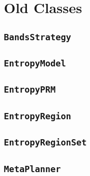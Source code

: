 \section{Old Classes}

\subsection{\texttt{BandsStrategy}}

\subsection{\texttt{EntropyModel}}

\subsection{\texttt{EntropyPRM}}

\subsection{\texttt{EntropyRegion}}

\subsection{\texttt{EntropyRegionSet}}

\subsection{\texttt{MetaPlanner}}


